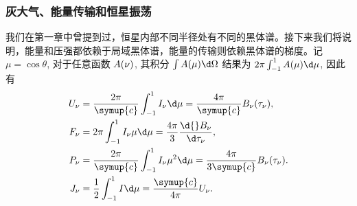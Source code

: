 \documentclass[../天体物理基础.tex]{subfiles}
\begin{document}
\subsubsection{灰大气、能量传输和恒星振荡}
我们在第一章中曾提到过，恒星内部不同半径处有不同的黑体谱。接下来我们将说明，能量和压强都依赖于局域黑体谱，能量的传输则依赖黑体谱的梯度。记 $\mu=\cos{\theta}$, 对于任意函数 $A\mleft(\nu\mright)$, 其积分 $\int A\mleft(\mu\mright)\d\Omega$ 结果为 $2\pi\int_{-1}^{1}A\mleft(\mu\mright)\d\mu$, 因此有
\begin{align}
U_{\nu}&=\frac{2\pi}{\symup{c}}\int_{-1}^{1}I_{\nu}\d\mu=\frac{4\pi}{\symup{c}}B_{\nu}\mleft(\tau_{\nu}\mright),\\
F_{\nu}&=2\pi\int_{-1}^{1}I_{\nu}\mu\d\mu=\frac{4\pi}{3}\frac{\d{}B_{\nu}}{\d\tau_{\nu}},\\
P_{\nu}&=\frac{2\pi}{\symup{c}}\int_{-1}^{1}I_{\nu}\mu^{2}\d\mu=\frac{4\pi}{3\symup{c}}B_{\nu}\mleft(\tau_{\nu}\mright).\\
J_{\nu}&=\frac{1}{2}\int_{-1}^{1}I\d\mu=\frac{\symup{c}}{4\pi{}}U_{\nu}.
\end{align}
\end{document}
